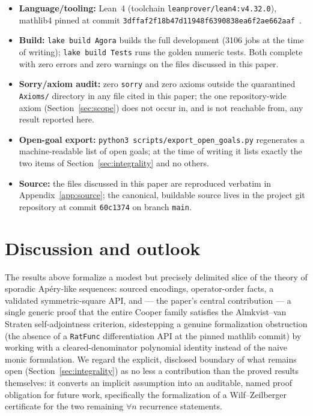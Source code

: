 \documentclass[11pt]{article}
\begin{document}
\begin{itemize}
  \item \textbf{Language/tooling:} Lean~4 (toolchain \texttt{leanprover/lean4:v4.32.0}),
    mathlib4 pinned at commit \texttt{3dffaf2f18b47d11948f6390838ea6f2ae662aaf}~\cite{mathlib}.
  \item \textbf{Build:} \texttt{lake build Agora} builds the full development
    (3106 jobs at the time of writing); \texttt{lake build Tests} runs the
    golden numeric tests. Both complete with zero errors and zero warnings on
    the files discussed in this paper.
  \item \textbf{Sorry/axiom audit:} zero \lstinline{sorry} and zero axioms
    outside the quarantined \texttt{Axioms/} directory in any file cited in
    this paper; the one repository-wide axiom (Section~\ref{sec:scope}) does
    not occur in, and is not reachable from, any result reported here.
  \item \textbf{Open-goal export:} \texttt{python3 scripts/export\_open\_goals.py}
    regenerates a machine-readable list of open goals; at the time of writing
    it lists exactly the two items of Section~\ref{sec:integrality} and no
    others.
  \item \textbf{Source:} the files discussed in this paper are reproduced
    verbatim in Appendix~\ref{app:source}; the canonical, buildable source
    lives in the project git repository at commit
    \texttt{60c1374} on branch \texttt{main}.
\end{itemize}

\section{Discussion and outlook}

The results above formalize a modest but precisely delimited slice of the
theory of sporadic Ap\'ery-like sequences: sourced encodings, operator-order
facts, a validated symmetric-square API, and --- the paper's central
contribution --- a single generic proof that the entire Cooper family
satisfies the Almkvist--van Straten self-adjointness criterion, sidestepping
a genuine formalization obstruction (the absence of a \lstinline{RatFunc}
differentiation API at the pinned mathlib commit) by working with a
cleared-denominator polynomial identity instead of the naive monic
formulation. We regard the explicit, disclosed boundary of what remains open
(Section~\ref{sec:integrality}) as no less a contribution than the proved
results themselves: it converts an implicit assumption into an auditable,
named proof obligation for future work, specifically the formalization of a
Wilf--Zeilberger certificate for the two remaining $\forall n$ recurrence
statements.
\end{document}

